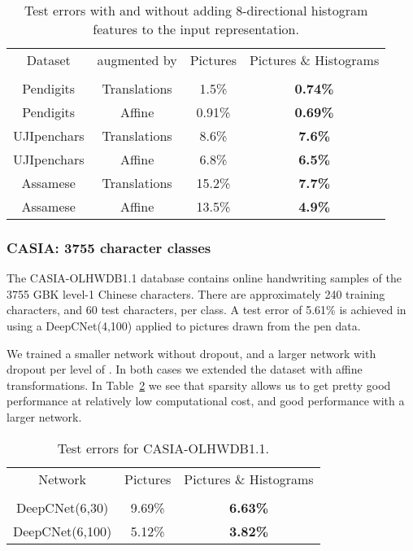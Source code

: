 \documentclass{article}
\numberwithin{equation}{subsection}
\begin{document}
\begin{table}[t]
\begin{center}
\noindent\begin{tabular}{|cc|c|c|}
\hline
Dataset     & augmented by & Pictures  & Pictures \& Histograms\\
            &              &      & \\
\hline Pendigits   & Translations & 1.5\%     & \bf{0.74\%}\\
Pendigits   & Affine       & 0.91\%    & \bf{0.69\%}\\
UJIpenchars & Translations & 8.6\%     & \bf{ 7.6\%} \\
UJIpenchars & Affine       & 6.8\%     & \bf{ 6.5\%} \\
Assamese    & Translations & 15.2\%    & \bf{ 7.7\%} \\
Assamese    & Affine       & 13.5\%    & \bf{ 4.9\%} \\
\hline
\end{tabular}
\end{center}
\caption{Test errors with and without adding 8-directional histogram features to the input representation.\label{M1_9}}
\end{table}


\subsubsection{CASIA: 3755 character classes}
The CASIA-OLHWDB1.1\cite{CASIA} database contains online handwriting samples of the 3755 GBK level-1 Chinese characters. There are approximately 240 training characters, and 60 test characters, per class. A test error of 5.61\% is achieved in \cite{multicolumndeep} using a DeepCNet(4,100) applied to  pictures drawn from the pen data.

We trained a smaller network without dropout, and a larger network with dropout per level of
 . In both cases we extended the dataset with affine transformations. In Table~\ref{casiaTable} we see that sparsity allows us to get pretty good performance at relatively low computational cost, and good performance with a larger network.

\begin{table}[t]
\begin{center}
\begin{tabular}{|c|c|c|}
\hline
Network  &Pictures    & Pictures \& Histograms \\
         & & \\
\hline
DeepCNet(6,30)  & 9.69\% & \bf{6.63}\%\\
\hline
DeepCNet(6,100)  & 5.12\% & \bf{3.82}\%\\
\hline
\end{tabular}
\end{center}
\caption{Test errors for CASIA-OLHWDB1.1.\label{casiaTable}}
\end{table}
\end{document}
